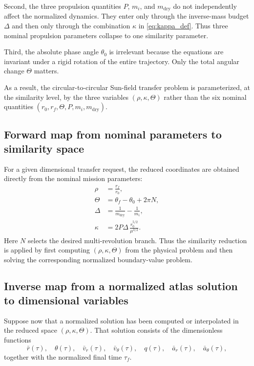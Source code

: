 \documentclass[journal, a4paper]{IEEEtran}
\begin{document}
Second, the three propulsion quantities \(P\), \(m_i\), and \(m_\mathrm{dry}\) do not independently affect the normalized dynamics. 
They enter only through the inverse-mass budget \(\Delta\) and then only through the combination \(\kappa\) in \eqref{eq:kappa_def}. 
Thus three nominal propulsion parameters collapse to one similarity parameter.

Third, the absolute phase angle \(\theta_0\) is irrelevant because the equations are invariant under a rigid rotation of the entire trajectory. 
Only the total angular change \(\Theta\) matters.

As a result, the circular-to-circular Sun-field transfer problem is parameterized, at the similarity level, by the three variables \((\rho,\kappa,\Theta)\) rather than the six nominal quantities \((r_0,r_f,\Theta,P,m_i,m_\mathrm{dry})\).


\subsection{Forward map from nominal parameters to similarity space}
For a given dimensional transfer request, the reduced coordinates are obtained directly from the nominal mission parameters:
\begin{align}
  \rho &= \frac{r_f}{r_0}, \\
  \Theta &= \theta_f-\theta_0+2\pi N, \\
  \Delta &= \frac{1}{m_\mathrm{dry}}-\frac{1}{m_i}, \\
  \kappa &= 2P\Delta\,\frac{r_0^{5/2}}{\mu^{3/2}}.
\end{align}
Here \(N\) selects the desired multi-revolution branch. 
Thus the similarity reduction is applied by first computing \((\rho,\kappa,\Theta)\) from the physical problem and then solving the corresponding normalized boundary-value problem.


\subsection{Inverse map from a normalized atlas solution to dimensional variables}
Suppose now that a normalized solution has been computed or interpolated in the reduced space \((\rho,\kappa,\Theta)\). 
That solution consists of the dimensionless functions
\[
\bar r(\tau),\quad
\theta(\tau),\quad
\bar v_r(\tau),\quad
\bar v_\theta(\tau),\quad
q(\tau),\quad
\bar a_r(\tau),\quad
\bar a_\theta(\tau),
\]
together with the normalized final time \(\tau_f\).
\end{document}
